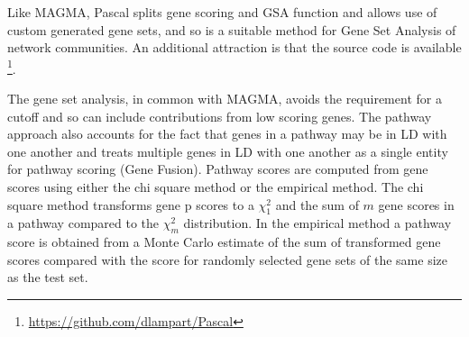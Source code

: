 Like MAGMA, Pascal splits gene scoring and GSA function and allows use of custom generated gene sets\cite{lamparter2016fast}, and so is a suitable method for Gene Set Analysis of network communities. An additional attraction is that the source code is available \footnote{\url{https://github.com/dlampart/Pascal}}.

The gene set analysis, in common with MAGMA, avoids the requirement for a cutoff and so can include contributions from low scoring genes.
The pathway approach also accounts for the fact that genes in a pathway may be in LD with one another and treats multiple genes in LD with one another as a single entity for pathway scoring (Gene Fusion). 
Pathway scores are computed from gene scores using either the  chi square method or the empirical method. The chi square method transforms gene p scores to a $\chi_1^2$ and the sum of $m$ gene scores in a pathway compared to the $\chi_m^2$ distribution. In the empirical method a pathway score is obtained from a Monte Carlo estimate of the sum of transformed gene scores compared with the score for randomly selected gene sets of the same size as the test set.


